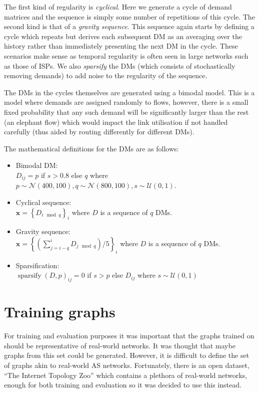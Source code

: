 The first kind of regularity is \emph{cyclical}. Here we generate a cycle of demand matrices and the sequence is simply some number of repetitions of this cycle. The second kind is that of a \emph{gravity sequence}\cite{roughan2002experience}. This sequence again starts by defining a cycle which repeats but derives each subsequent DM as an averaging over the history rather than immediately presenting the next DM in the cycle. These scenarios make sense as temporal regularity is often seen in large networks such as those of ISPs\cite{fortz2002optimizing}. We also \emph{sparsify} the DMs (which consists of stochastically removing demands) to add noise to the regularity of the sequence.

The DMs in the cycles themselves are generated using a bimodal model\cite{medina2002traffic}. This is a model where demands are assigned randomly to flows, however, there is a small fixed probability that any such demand will be significantly larger than the rest (an elephant flow) which would impact the link utilisation if not handled carefully (thus aided by routing differently for different DMs).

The mathematical definitions for the DMs are as follows:
\begin{itemize}
  \item Bimodal DM:\\
    $D_{ij} = p$ if $s > 0.8$ else $q$ where $p \sim \mathcal{N}(400, 100), q \sim \mathcal{N}(800, 100), s \sim \mathcal{U}(0,1)$.
  \item Cyclical sequence:\\
    $\bm{x} = \left\{ D_{i \mod q} \right\}_{i}$ where $D$ is a sequence of $q$ DMs.
  \item Gravity sequence:\\
    $\bm{x} = \left\{\left(\sum_{j=i-q}^{i}{D_{j \mod q}}\right) / 5 \right\}_{i}$ where $D$ is a sequence of $q$ DMs.
  \item Sparsification:\\
    $\operatorname{sparsify}(D, p)_{ij} = 0$ if $s > p$ else $D_{ij}$ where $s \sim \mathcal{U}(0,1)$
\end{itemize}

\section{Training graphs}
For training and evaluation purposes it was important that the graphs trained on should be representative of real-world networks. It was thought that maybe graphs from this set could be generated. However, it is difficult to define the set of graphs akin to real-world AS networks. Fortunately, there is an open dataset, ``The Internet Topology Zoo''\cite{6027859} which contains a plethora of real-world networks, enough for both training and evaluation so it was decided to use this instead.
